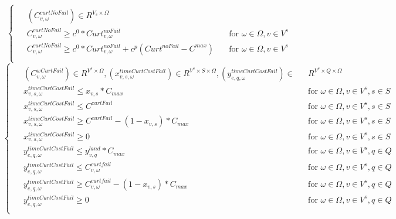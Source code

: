 \documentclass[a4paper,12pt]{article}
\begin{document}
\begin {enumerate}
{\begin{equation}
        \begin{cases}
            \begin{alignedat}{2}
                & (C_{v,\omega}^{curtNoFail}) \in R^{V_{s} \times \Omega} \\
                & C_{v,\omega}^{curtNoFail} \geq c^{0}*Curt_{v,\omega}^{noFail} & \quad  \text{for } \omega \in\Omega, v \in V^{s} \\
                & C_{v,\omega}^{curtNoFail} \geq c^{0}*Curt_{v,\omega}^{noFail} + c^{p}(Curt^{noFail}-C^{max}) & \quad  \text{for } \omega \in\Omega, v \in V^{s} \\
            \end{alignedat}
        \end{cases}
    \end{equation}
    \begin{equation}
        \begin{cases}
            \begin{alignedat}{2}
                & (C_{v,\omega}^{wCurtFail}) \in R^{V^{s} \times \Omega}, (x_{v,s,\omega}^{timeCurtCostFail}) \in R^{V^{s} \times S \times \Omega},(y_{e,q, \omega}^{timeCurtCostFail}) \in && R^{V^{s} \times Q \times \Omega} \\
                & x_{v,s,\omega}^{timeCurtCostFail} \leq x_{v,s} * C_{max} && \text{for } \omega \in\Omega, v \in V^{s}, s \in S\\
                & x_{v,s,\omega}^{timeCurtCostFail} \leq C^{curtFail} && \text{for } \omega \in\Omega, v \in V^{s}, s \in S \\
                & x_{v,s,\omega}^{timeCurtCostFail} \geq C^{curtFail} - (1 - x_{v,s})*C_{max} && \text{for } \omega \in\Omega, v \in V^{s}, s \in S\\
                & x_{v,s,\omega}^{timeCurtCostFail} \geq 0 && \text{for } \omega \in\Omega, v \in V^{s}, s \in S\\
                & y_{e,q,\omega}^{timeCurtCostFail} \leq y_{v,q}^{land}*C_{max} && \text{for } \omega \in\Omega, v \in V^{s}, q \in Q\\
                & y_{e,q,\omega}^{timeCurtCostFail} \leq C_{v,\omega}^{curtfail} && \text{for } \omega \in\Omega, v \in V^{s}, q \in Q\\
                & y_{e,q,\omega}^{timeCurtCostFail} \geq C_{v,\omega}^{curtfail} - (1 - x_{v,s})*C_{max} && \text{for } \omega \in\Omega, v \in V^{s}, q \in Q\\
                & y_{e,q,\omega}^{timeCurtCostFail} \geq 0 && \text{for } \omega \in\Omega, v \in V^{s}, q \in Q\\

\end{alignedat}
\end{cases}
\end{equation}}
\end{enumerate}
\end{document}
